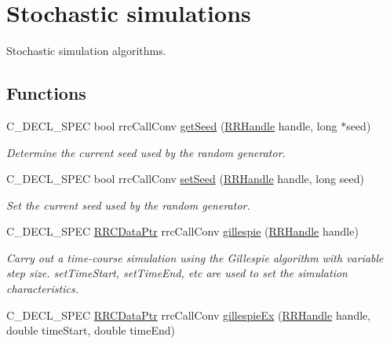 \hypertarget{group__stochastic}{}\section{Stochastic simulations}
\label{group__stochastic}


Stochastic simulation algorithms.  


\subsection*{Functions}
\begin{DoxyCompactItemize}
\item 
C\+\_\+\+D\+E\+C\+L\+\_\+\+S\+P\+E\+C bool rrc\+Call\+Conv \hyperlink{group__stochastic_ga7f5813153b9ea59a30cbc2cdfbdedffc}{get\+Seed} (\hyperlink{rrc__types_8h_a1d68f0592372208fa5a5f2799ea4b3ae}{R\+R\+Handle} handle, long $\ast$seed)
\begin{DoxyCompactList}\small\item\em Determine the current seed used by the random generator. \end{DoxyCompactList}\item 
C\+\_\+\+D\+E\+C\+L\+\_\+\+S\+P\+E\+C bool rrc\+Call\+Conv \hyperlink{group__stochastic_gaa694837d219e6fd8c55183ad5aa05910}{set\+Seed} (\hyperlink{rrc__types_8h_a1d68f0592372208fa5a5f2799ea4b3ae}{R\+R\+Handle} handle, long seed)
\begin{DoxyCompactList}\small\item\em Set the current seed used by the random generator. \end{DoxyCompactList}\item 
C\+\_\+\+D\+E\+C\+L\+\_\+\+S\+P\+E\+C \hyperlink{rrc__types_8h_a9da8b124eb9c3c0045f8926c6a420b4a}{R\+R\+C\+Data\+Ptr} rrc\+Call\+Conv \hyperlink{group__stochastic_gaeaf09f5ac0fcf9df24ccb0e62c82703e}{gillespie} (\hyperlink{rrc__types_8h_a1d68f0592372208fa5a5f2799ea4b3ae}{R\+R\+Handle} handle)
\begin{DoxyCompactList}\small\item\em Carry out a time-\/course simulation using the Gillespie algorithm with variable step size. set\+Time\+Start, set\+Time\+End, etc are used to set the simulation characteristics. \end{DoxyCompactList}\item 
C\+\_\+\+D\+E\+C\+L\+\_\+\+S\+P\+E\+C \hyperlink{rrc__types_8h_a9da8b124eb9c3c0045f8926c6a420b4a}{R\+R\+C\+Data\+Ptr} rrc\+Call\+Conv \hyperlink{group__stochastic_ga90d4504aafacfdc2148bedbde8b84823}{gillespie\+Ex} (\hyperlink{rrc__types_8h_a1d68f0592372208fa5a5f2799ea4b3ae}{R\+R\+Handle} handle, double time\+Start, double time\+End)

\end{DoxyCompactItemize}
